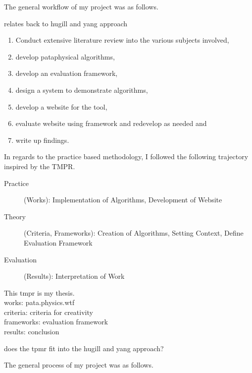 The general workflow of my project was as follows.
\begin{draft}
relates back to hugill and yang approach
\end{draft}

\begin{enumerate}
  \item Conduct extensive literature review into the various subjects involved,
  \item develop pataphysical algorithms,
  \item develop an evaluation framework,
  \item design a system to demonstrate algorithms,
  \item develop a website for the tool,
  \item evaluate website using framework and redevelop as needed and
  \item write up findings.
\end{enumerate}

In regards to the practice based methodology, I followed the following trajectory inspired by the \ac{TMPR}.


\begin{description}
  \item [Practice] (Works): Implementation of Algorithms, Development of Website
  \item [Theory] (Criteria, Frameworks): Creation of Algorithms, Setting Context, Define Evaluation Framework
  \item [Evaluation] (Results): Interpretation of Work
\end{description}

\begin{draft}
  This tmpr is my thesis.\\
  works: pata.physics.wtf\\
  criteria: criteria for creativity\\
  frameworks: evaluation framework\\
  results: conclusion
\end{draft}

\begin{draft}
  does the tpmr fit into the hugill and yang approach?
\end{draft}



The general process of my project was as follows.

